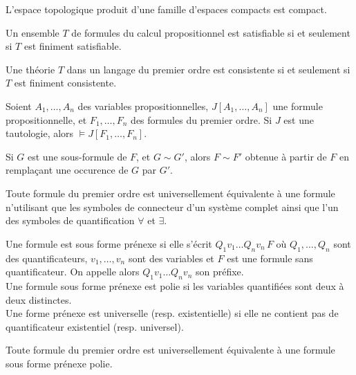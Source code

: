\documentclass[9pt]{beamer}
\begin{document}
\begin{frame}
\begin{theorem}[Tychonov]
  L'espace topologique produit d'une famille d'espaces compacts est compact.
\end{theorem}

\begin{theorem}
  Un ensemble $T$ de formules du calcul propositionnel est satisfiable si et seulement si $T$ est finiment satisfiable.
\end{theorem}

\begin{theorem}
  Une théorie $T$ dans un langage du premier ordre est consistente si et seulement si $T$ est finiment consistente.
\end{theorem}
\end{frame}

\begin{frame}
\begin{lemma}
  Soient $A_1,\dots,A_n$ des variables propositionnelles, $J[A_1,\dots,A_n]$ une formule propositionnelle, et $F_1,\dots,F_n$ des formules du premier ordre.
  Si $J$ est une tautologie, alors $\models J[F_1,\dots,F_n]$.
\end{lemma}

\begin{lemma}
  Si $G$ est une sous-formule de $F$, et $G \sim G'$, alors $F \sim F'$ obtenue à partir de $F$ en remplaçant une occurence de $G$ par $G'$.
\end{lemma}

\begin{theorem}
  Toute formule du premier ordre est universellement équivalente à une formule n'utilisant que les symboles de connecteur d'un système complet ainsi que l'un des symboles de quantification $\forall$ et $\exists$.
\end{theorem}
\end{frame}

\begin{frame}
Une formule est sous forme prénexe si elle s'écrit $Q_1v_1\dots Q_nv_n\, F$ où $Q_1,\dots,Q_n$ sont des quantificateurs, $v_1,\dots,v_n$ sont des variables et $F$ est une formule sans quantificateur. On appelle alors $Q_1v_1\dots Q_nv_n$ son préfixe.\\
Une formule sous forme prénexe est polie si les variables quantifiées sont deux à deux distinctes.\\
Une forme prénexe est universelle (resp. existentielle) si elle ne contient pas de quantificateur existentiel (resp. universel).

\begin{theorem}
  Toute formule du premier ordre est universellement équivalente à une formule sous forme prénexe polie.
\end{theorem}
\end{frame}
\end{document}
